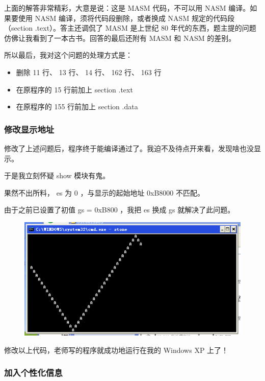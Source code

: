 \documentclass{article}
\begin{document}
上面的解答非常精彩，大意是说：这是 MASM 代码，不可以用 NASM 编译。如果要使用 NASM 编译，须将代码段删除，或者换成 NASM 规定的代码段（section .text）。答主还调侃了 MASM 是上世纪 80 年代的东西，题主提的问题仿佛让我看到了一本古书。回答的最后还附有 MASM 和 NASM 的差别。

所以最后，我对这个问题的处理方式是：

\begin{itemize}
\item 删除 11 行、 13 行、 14 行、 162 行、 163 行
\item 在原程序的 15 行前加上 section .text
\item 在原程序的 155 行前加上 section .data
\end{itemize}

\subsubsection{修改显示地址}

修改了上述问题后，程序终于能编译通过了。我迫不及待点开来看，发现啥也没显示。

于是我立刻怀疑 show 模块有鬼。

果然不出所料， es 为 0 ，与显示的起始地址 0xB8000 不匹配。

由于之前已设置了初值 gs = 0xB800 ，我把 es 换成 gs 就解决了此问题。

\begin{figure}[!hbp]
	\centering
	\includegraphics[scale=0.6]{pics/3.png}
\end{figure}

修改以上代码，老师写的程序就成功地运行在我的 Windows XP 上了！

\subsubsection{加入个性化信息}
\end{document}
